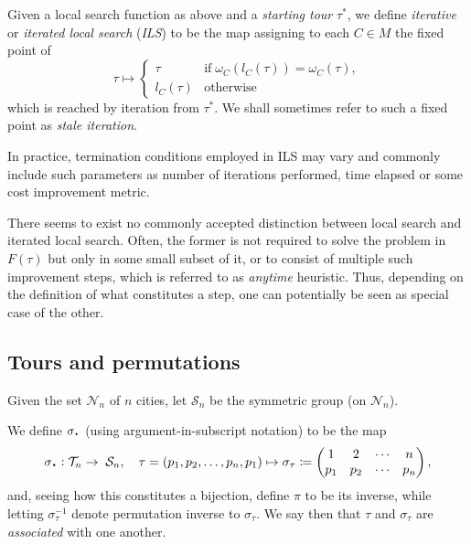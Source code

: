 \documentclass[index=totoc,bibliography=totoc]{scrartcl}
\newcommand{\annotation}[1]{\marginpar{\small\itshape\color{green}#1}}
\newcommand*{\Cdot}{\raisebox{-0.30ex}{\scalebox{1.5}{$\cdot$}}}
\numberwithin{equation}{section}
\numberwithin{figure}{section}
\numberwithin{table}{section}
\let\defstyle\itshape
\begin{document}
\begin{define}[ILS]
\label{def:ils}
  Given a local search function as above and a {\defstyle starting tour}
  $\tau^\ast$, we define {\defstyle iterative} or {\defstyle iterated local search}
  ({\defstyle ILS}) to be the map assigning to each $C \in M$ the
  fixed point of
  \[
    \tau \mapsto
    \begin{cases}
      \tau \quad & \text{if} \;
      \omega_C\left(l_C\left(\tau\right)\right) = \omega_C\left(\tau\right),
      \\
      l_C\left(\tau\right) & \text{otherwise}
    \end{cases}
  \]
  which is reached by iteration from $\tau^\ast$.
  We shall sometimes refer to such a fixed point as {\defstyle stale iteration}.
\end{define}

In practice, termination conditions employed in ILS may vary and commonly
include such parameters as number of iterations performed, time elapsed
or some cost improvement metric.

\annotation{Necessary?}
\begin{remark}
  There seems to exist no commonly accepted distinction between local
  search and iterated local search.  Often, the former is not required to
  solve the problem in $F\left(\tau\right)$ but only in some small subset
  of it, or to consist of multiple such improvement steps, which is
  referred to as {\defstyle anytime} heuristic.  Thus, depending on the
  definition of what constitutes a step, one can potentially be seen as
  special case of the other.
\end{remark}

\subsection{Tours and permutations}

Given the set $\mathcal{N}_n$ of $n$ cities, let $\mathcal{S}_n$ be the symmetric group (on $\mathcal{N}_n$).

\begin{define}
  We define $\sigma_{\Cdot}$ (using argument-in-subscript notation) to be the map
  \[
      \sigma_{\Cdot} :
      \mathcal{T}_n \to \; \mathcal{S}_n, \quad
      \tau = \left(p_1, p_2, \ldots, p_n, p_1 \right)
      \mapsto
    \sigma_\tau \coloneqq
    \begin{pmatrix}
      1 & 2 & \cdots & n \\
      p_1 & p_2 & \cdots &  p_n
    \end{pmatrix},
  \]
  and, seeing how this constitutes a bijection, define $\pi$ to be its inverse,
  while letting $\sigma_\tau^{-1}$ denote permutation inverse to $\sigma_\tau$.
  We say then that $\tau$ and $\sigma_\tau$ are {\defstyle associated} with one another.
\end{define}
\end{document}
